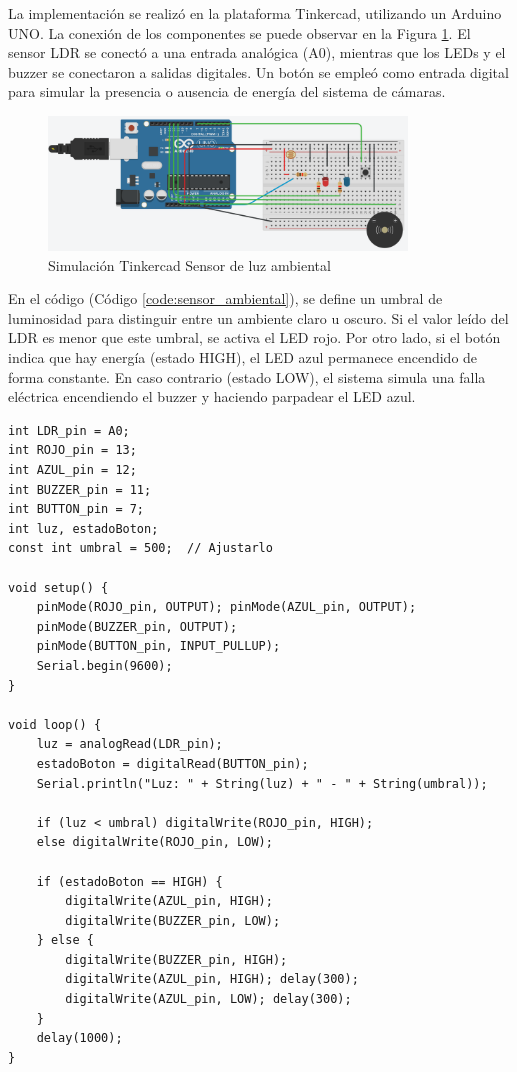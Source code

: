 \documentclass{article}
\begin{document}
La implementación se realizó en la plataforma Tinkercad, utilizando un Arduino UNO. La conexión de los componentes se puede observar en la Figura \ref{fig:luz_ambiental}. El sensor LDR se conectó a una entrada analógica (A0), mientras que los LEDs y el buzzer se conectaron a salidas digitales. Un botón se empleó como entrada digital para simular la presencia o ausencia de energía del sistema de cámaras.

\begin{figure}[H]
    \centering
    \includegraphics[width=0.85\textwidth]{./img/ckpt_1.png}
    \caption{Simulación Tinkercad Sensor de luz ambiental}
    \label{fig:luz_ambiental}
\end{figure}

En el código (Código \ref{code:sensor_ambiental}), se define un umbral de luminosidad para distinguir entre un ambiente claro u oscuro. Si el valor leído del LDR es menor que este umbral, se activa el LED rojo. Por otro lado, si el botón indica que hay energía (estado HIGH), el LED azul permanece encendido de forma constante. En caso contrario (estado LOW), el sistema simula una falla eléctrica encendiendo el buzzer y haciendo parpadear el LED azul.

\begin{lstlisting}[style=cppstyle, caption={Código en C++ para el sensor ambiental.}, label={code:sensor_ambiental}]
int LDR_pin = A0;
int ROJO_pin = 13;
int AZUL_pin = 12;
int BUZZER_pin = 11;
int BUTTON_pin = 7;
int luz, estadoBoton;
const int umbral = 500;  // Ajustarlo

void setup() {
    pinMode(ROJO_pin, OUTPUT); pinMode(AZUL_pin, OUTPUT);
    pinMode(BUZZER_pin, OUTPUT);
    pinMode(BUTTON_pin, INPUT_PULLUP);
    Serial.begin(9600);
}

void loop() {
    luz = analogRead(LDR_pin);
    estadoBoton = digitalRead(BUTTON_pin);
    Serial.println("Luz: " + String(luz) + " - " + String(umbral));
    
    if (luz < umbral) digitalWrite(ROJO_pin, HIGH);
    else digitalWrite(ROJO_pin, LOW);
    
    if (estadoBoton == HIGH) {
        digitalWrite(AZUL_pin, HIGH);
        digitalWrite(BUZZER_pin, LOW);
    } else {
        digitalWrite(BUZZER_pin, HIGH);
        digitalWrite(AZUL_pin, HIGH); delay(300);
        digitalWrite(AZUL_pin, LOW); delay(300);
    }
    delay(1000);
}    
\end{lstlisting}
\end{document}
